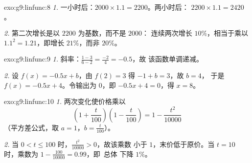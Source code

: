 \begin{solution}{exo:g9:linfunc:8}
\emph{1.} 一小时后：$2000 \times 1.1 = 2200$。两小时后：
$2200 \times 1.1 = 2420$。

\emph{2.} 第二次增长是以 $2200$ 为基数，而不是 $2000$：
连续两次增长 $10\%$，相当于乘以 $1.1^2 = 1.21$，即增长 $21\%$，而非
$20\%$。
\end{solution}

\begin{solution}{exo:g9:linfunc:9}
\emph{1.} 斜率：$\frac{1 - 3}{6 - 2} = \frac{-2}{4} = -0.5$，故
该函数单调递减。

\emph{2.} 设 $f(x) = -0.5x + b$，由 $f(2) = 3$ 得 $-1 + b = 3$，故 $b = 4$，
于是 $f(x) = -0.5x + 4$。令输出为 $0$，即 $-0.5x + 4 = 0$，得 $x = 8$。
\end{solution}

\begin{solution}{exo:g9:linfunc:10}
\emph{1.} 两次变化使价格乘以
\[
\left(1 + \frac{t}{100}\right)\left(1 - \frac{t}{100}\right)
= 1 - \frac{t^2}{10000}
\]
（平方差公式，取 $a = 1$，$b = \frac{t}{100}$）。

\emph{2.} 当 $0 < t \leq 100$ 时，$\frac{t^2}{10000} > 0$，故该乘数
小于 $1$，末价低于原价。当
$t = 10$ 时，乘数为 $1 - \frac{100}{10000} = 0.99$，即\ 总体
下降 $1\%$。
\end{solution}

